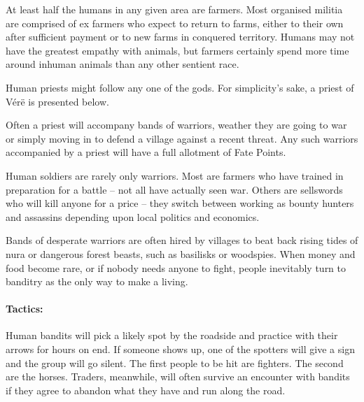 \begin{multicols}{2}
At least half the humans in any given area are farmers.
Most organised militia are comprised of ex farmers who expect to return to farms, either to their own after sufficient payment or to new farms in conquered territory.
Humans may not have the greatest empathy with animals, but farmers certainly spend more time around inhuman animals than any other sentient race.


\label{human_priest}

Human priests might follow any one of the gods.
For simplicity's sake, a priest of V\'{e}r\"{e} is presented below.


Often a priest will accompany bands of warriors, weather they are going to war or simply moving in to defend a village against a recent threat.
Any such warriors accompanied by a priest will have a full allotment of Fate Points.

\label{human_soldier}

Human soldiers are rarely only warriors.
Most are farmers who have trained in preparation for a battle -- not all have actually seen war.
Others are sellswords who will kill anyone for a price -- they switch between working as bounty hunters and assassins depending upon local politics and economics.

Bands of desperate warriors are often hired by villages to beat back rising tides of nura or dangerous forest beasts, such as basilisks or woodspies.
When money and food become rare, or if nobody needs anyone to fight, people inevitably turn to banditry as the only way to make a living.

\paragraph{Tactics:} Human bandits will pick a likely spot by the roadside and practice with their arrows for hours on end.
If someone shows up, one of the spotters will give a sign and the group will go silent.
The first people to be hit are fighters.
The second are the horses.
Traders, meanwhile, will often survive an encounter with bandits if they agree to abandon what they have and run along the road.



\vfill\null
\end{multicols}

